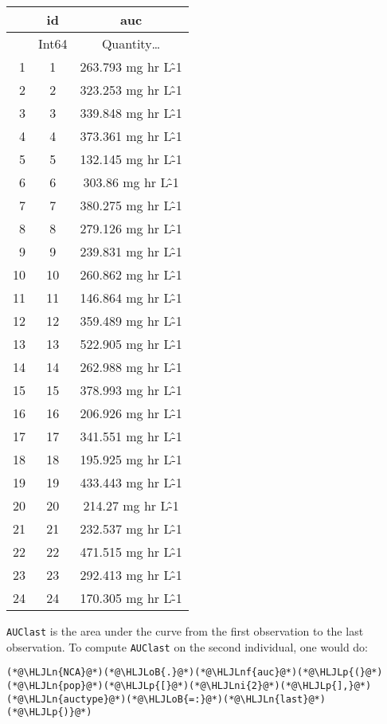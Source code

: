 \documentclass[12pt,a4paper]{article}
\newcommand{\HLJLn}[1]{#1}
\newcommand{\HLJLnf}[1]{\textcolor[RGB]{66,102,213}{#1}}
\newcommand{\HLJLni}[1]{\textcolor[RGB]{59,151,46}{#1}}
\newcommand{\HLJLoB}[1]{\textcolor[RGB]{102,102,102}{\textbf{#1}}}
\newcommand{\HLJLp}[1]{#1}
\begin{document}
\begin{tabular}{r|cc}
	& id & auc\\
	\hline
	& Int64 & Quantity…\\
	\hline
	1 & 1 & 263.793 mg hr L\^-1 \\
	2 & 2 & 323.253 mg hr L\^-1 \\
	3 & 3 & 339.848 mg hr L\^-1 \\
	4 & 4 & 373.361 mg hr L\^-1 \\
	5 & 5 & 132.145 mg hr L\^-1 \\
	6 & 6 & 303.86 mg hr L\^-1 \\
	7 & 7 & 380.275 mg hr L\^-1 \\
	8 & 8 & 279.126 mg hr L\^-1 \\
	9 & 9 & 239.831 mg hr L\^-1 \\
	10 & 10 & 260.862 mg hr L\^-1 \\
	11 & 11 & 146.864 mg hr L\^-1 \\
	12 & 12 & 359.489 mg hr L\^-1 \\
	13 & 13 & 522.905 mg hr L\^-1 \\
	14 & 14 & 262.988 mg hr L\^-1 \\
	15 & 15 & 378.993 mg hr L\^-1 \\
	16 & 16 & 206.926 mg hr L\^-1 \\
	17 & 17 & 341.551 mg hr L\^-1 \\
	18 & 18 & 195.925 mg hr L\^-1 \\
	19 & 19 & 433.443 mg hr L\^-1 \\
	20 & 20 & 214.27 mg hr L\^-1 \\
	21 & 21 & 232.537 mg hr L\^-1 \\
	22 & 22 & 471.515 mg hr L\^-1 \\
	23 & 23 & 292.413 mg hr L\^-1 \\
	24 & 24 & 170.305 mg hr L\^-1 \\
\end{tabular}


\texttt{AUClast} is the area under the curve from the first observation to the last observation. To compute \texttt{AUClast} on the second individual, one would do:


\begin{lstlisting}
(*@\HLJLn{NCA}@*)(*@\HLJLoB{.}@*)(*@\HLJLnf{auc}@*)(*@\HLJLp{(}@*)(*@\HLJLn{pop}@*)(*@\HLJLp{[}@*)(*@\HLJLni{2}@*)(*@\HLJLp{],}@*) (*@\HLJLn{auctype}@*)(*@\HLJLoB{=:}@*)(*@\HLJLn{last}@*)(*@\HLJLp{)}@*)
\end{lstlisting}
\end{document}
